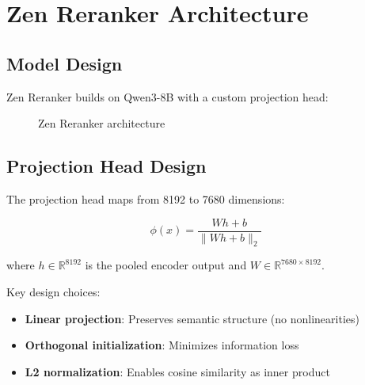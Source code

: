 \section{Zen Reranker Architecture}

\label{sec:architecture}

\subsection{Model Design}

Zen Reranker builds on Qwen3-8B with a custom projection head:

\begin{figure}[t]
\centering
{}
\caption{Zen Reranker architecture}
\label{fig:architecture}
\end{figure}

\subsection{Projection Head Design}

The projection head maps from 8192 to 7680 dimensions:

\begin{equation}
\phi(x) = \frac{Wh + b}{\|Wh + b\|_2}
\end{equation}

where $h \in \mathbb{R}^{8192}$ is the pooled encoder output and $W \in \mathbb{R}^{7680 \times 8192}$.

Key design choices:
\begin{itemize}
    \item \textbf{Linear projection}: Preserves semantic structure (no nonlinearities)
    \item \textbf{Orthogonal initialization}: Minimizes information loss
    \item \textbf{L2 normalization}: Enables cosine similarity as inner product
\end{itemize}

